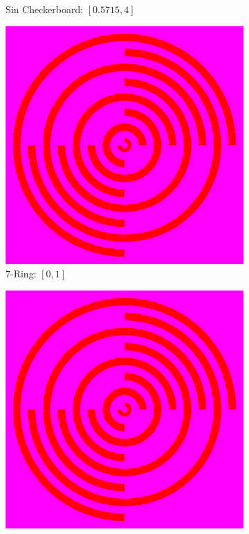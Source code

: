 \documentclass[11pt]{article}       %
\begin{document}
\begin{figure}
\begin{subfigure}[b]{.4\columnwidth}
		\caption{Sin Checkerboard: $[0.5715, 4]$}
	\end{subfigure}
	\begin{subfigure}[b]{.4\columnwidth}
		\includegraphics[width=\textwidth]{Figures/speed_7_rings}
		\caption{7-Ring: $[0, 1]$}
	\end{subfigure}
	\begin{subfigure}[b]{.4\columnwidth}
		\includegraphics[width=\textwidth]{Figures/speed_7_rings_permeable}

\end{subfigure}
\end{figure}
\end{document}
